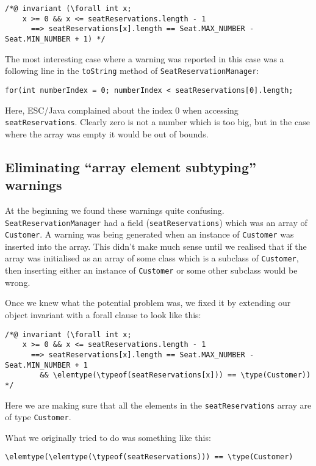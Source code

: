 \documentclass[11pt]{article}
\begin{document}
\noindent
\begin{verbatim}
/*@ invariant (\forall int x;
    x >= 0 && x <= seatReservations.length - 1
      ==> seatReservations[x].length == Seat.MAX_NUMBER - Seat.MIN_NUMBER + 1) */
\end{verbatim}

The most interesting case where a warning was reported in this case was a following line in the \verb|toString| method of \verb|SeatReservationManager|:

\begin{verbatim}
for(int numberIndex = 0; numberIndex < seatReservations[0].length;
\end{verbatim}

Here, ESC/Java complained about the index 0 when accessing \verb|seatReservations|. Clearly zero is not a number which is too big, but in the case where the array was empty it would be out of bounds.

\subsection{Eliminating ``array element subtyping'' warnings}

At the beginning we found these warnings quite confusing. \verb|SeatReservationManager| had a field (\verb|seatReservations|) which was an array of \verb|Customer|. A warning was being generated when an instance of \verb|Customer| was inserted into the array. This didn't make much sense until we realised that if the array was initialised as an array of some class which is a subclass of \verb|Customer|, then inserting either an instance of \verb|Customer| or some other subclass would be wrong.

Once we knew what the potential problem was, we fixed it by extending our object invariant with a forall clause to look like this:

\noindent
\begin{verbatim}
/*@ invariant (\forall int x;
    x >= 0 && x <= seatReservations.length - 1
      ==> seatReservations[x].length == Seat.MAX_NUMBER - Seat.MIN_NUMBER + 1
        && \elemtype(\typeof(seatReservations[x])) == \type(Customer)) */
\end{verbatim}

Here we are making sure that all the elements in the \verb|seatReservations| array are of type \verb|Customer|.

What we originally tried to do was something like this:

\begin{verbatim}
\elemtype(\elemtype(\typeof(seatReservations))) == \type(Customer)
\end{verbatim}
\end{document}
